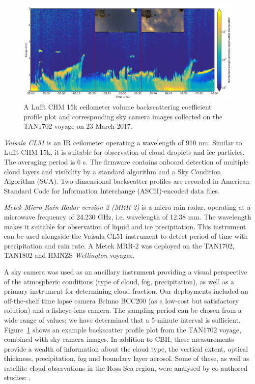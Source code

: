 \begin{figure}[t]
\centerline{\includegraphics[width=1.12\textwidth]{fig/chm15k_profile.png}}
\caption[Lufft CHM 15k ceilometer volume backscattering coefficient profile plot]{
A Lufft CHM 15k ceilometer volume backscattering coefficient profile plot
and corresponding sky camera images collected on the TAN1702 voyage
on 23 March 2017.
}
\label{fig:1:chm15k-profile}
\end{figure}

\textit{Vaisala CL51} is an IR ceilometer operating a
wavelength of 910 nm. Similar to Lufft CHM 15k, it is suitable for observation
of cloud droplets and ice particles. The averaging period is 6 s.
The firmware contains onboard detection of multiple cloud layers and
visibility by a standard algorithm and a Sky Condition Algorithm (SCA).
Two-dimensional backscatter profiles are recorded in
American Standard Code for Information Interchange (ASCII)-encoded data files.

\textit{Metek Micro Rain Radar version 2 (MRR-2)} is a micro rain radar, operating at a microwave frequency of
24.230 GHz, i.e. wavelength of 12.38 mm. The wavelength makes it suitable
for observation of liquid and ice precipitation. This instrument can
be used alongside the Vaisala CL51 instrument to detect period of time with
precipitation and rain rate. A Metek MRR-2 was deployed on the TAN1702, TAN1802
and HMNZS \textit{Wellington} voyages.

A sky camera was used as an ancillary instrument providing a visual
perspective of the atmospheric conditions (type of cloud, fog,
precipitation), as well as a primary instrument for determining cloud fraction.
Our deployments included
an off-the-shelf time lapse camera Brinno BCC200 (as a low-cost but
satisfactory solution) and a fisheye-lens camera.
The sampling period can be chosen from a wide range of values; we have
determined that a 5-minute interval is sufficient.
Figure\ \ref{fig:1:chm15k-profile} shows an example backscatter profile plot
from the TAN1702 voyage, combined with sky camera images. 
In addition to CBH, these measurements provide a wealth
of information about the cloud type, the vertical extent, optical thickness,
precipitation, fog and boundary layer aerosol. Some of these, as well
as satellite cloud observations in the Ross Sea region, were analysed
by co-authored studies: \cite{klekociuk2020,jolly2018,hartery2020a,hartery2020b}.

